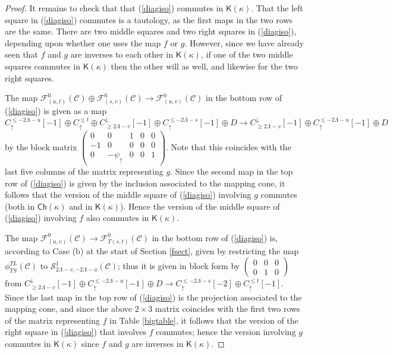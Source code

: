 \documentclass[11pt]{amsart}
\theoremstyle{definition}
\theoremstyle{remark}
\numberwithin{equation}{section}
\begin{document}
\begin{proof}
It remains to check that that (\ref{diagiso}) commutes in $\mathsf{K}(\kappa)$.  That the left square in (\ref{diagiso}) commutes is a tautology, as the first maps in the two rows are the same.  There are two middle squares and two right squares in (\ref{diagiso}), depending upon whether one uses the map $f$ or $g$.  However, since we have already seen that $f$ and $g$ are inverses to each other in $\mathsf{K}(\kappa)$, if one of the two middle squares commutes in $\mathsf{K}(\kappa)$ then the other will as well, and likewise for the two right squares.   

The map $\mathcal{F}^{0}_{(u,t)}(\mathcal{C})\oplus \mathcal{F}^{0}_{(s,v)}(\mathcal{C})\to \mathcal{F}^{0}_{(u,v)}(\mathcal{C})$ in the bottom row of (\ref{diagiso}) is given as a map $C_{\uparrow}^{\leq -2\Lambda-u}[-1]\oplus C_{\uparrow}^{\leq t}\oplus C^{\downarrow}_{\geq 2\Lambda-v}[-1]\oplus C_{\uparrow}^{\leq -2\Lambda-s}[-1]\oplus D\to C^{\downarrow}_{\geq 2\Lambda-v}[-1]\oplus C_{\uparrow}^{\leq -2\Lambda-u}[-1]\oplus D$ by the block matrix $\left(\begin{array}{ccccc} 0 & 0 & 1 & 0 & 0 \\ -1 & 0 & 0 & 0 & 0 \\ 0 & -\psi_{\uparrow} & 0 & 0 & 1\end{array}\right)$.  Note that this coincides with the last five columns of the matrix representing $g$.  Since the second map in the top row of (\ref{diagiso}) is given by the inclusion associated to the mapping cone, it follows that the version of the middle square of (\ref{diagiso}) involving $g$ commutes (both in $\mathsf{Ch}(\kappa)$ and in $\mathsf{K}(\kappa)$).  Hence the version of the middle square of (\ref{diagiso}) involving $f$ also commutes in $\mathsf{K}(\kappa)$.  

The map $\mathcal{F}^{0}_{(u,v)}(\mathcal{C})\to \mathcal{F}^{0}_{T(s,t)}(\mathcal{C})$ in the bottom row of (\ref{diagiso}) is, according to Case (b) at the start of Section \ref{fsect}, given by restricting the map $\phi_{TS}^{TL}(\mathcal{C})$ to $\mathcal{S}^1_{2\Lambda-v,-2\Lambda-u}(\mathcal{C})$; thus it is given in block form by $\left(\begin{array}{ccc} 0 & 0 & 0 \\ 0 & 1 & 0\end{array}\right)$ from $C^{\downarrow}_{\geq 2\Lambda-v}[-1]\oplus C_{\uparrow}^{\leq -2\Lambda-u}[-1]\oplus D\to C_{\uparrow}^{\leq -2\Lambda-s}[-2]\oplus C_{\uparrow}^{\leq t}[-1]$.  Since the last map in the top row of (\ref{diagiso}) is the projection associated to the mapping cone, and since the above $2\times 3$ matrix coincides with the first two rows of the matrix representing $f$ in Table \ref{bigtable}, it follows that the version of the right square in (\ref{diagiso}) that involves $f$ commutes; hence the version involving $g$ commutes in $\mathsf{K}(\kappa)$ since $f$ and $g$ are inverses in $\mathsf{K}(\kappa)$.  


\end{proof}
\end{document}
